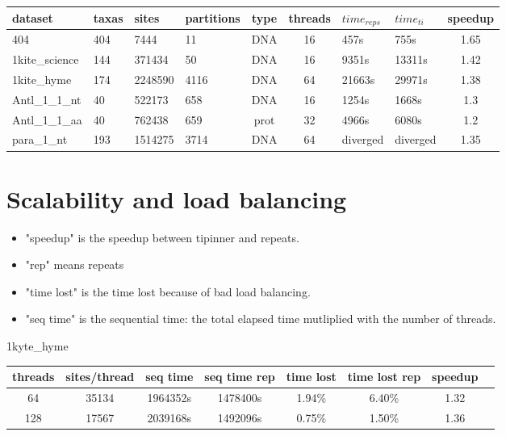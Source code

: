 \documentclass[a4paper]{article}
\begin{document}
\begin{tabular}{|l|l|l|l|c|c|l|l|c|}
\hline dataset                    & taxas & sites    & partitions & type & threads & $time_{reps}$ & $time_{ti}$ & speedup\\
\hline 404                        & 404   &  7444    & 11         & DNA  & 16 & 457s     &  755s     & 1.65  \\
\hline 1kite\_science             & 144   &  371434  & 50         & DNA  & 16 & 9351s    &  13311s   & 1.42  \\
\hline 1kite\_hyme                & 174   &  2248590 & 4116       & DNA  & 64 & 21663s   &  29971s   & 1.38 \\
\hline Antl\_1\_1\_nt             & 40    &  522173  & 658        & DNA  & 16 & 1254s    &  1668s    & 1.3  \\
\hline Antl\_1\_1\_aa             & 40    &  762438  & 659        & prot & 32 & 4966s    &  6080s    & 1.2\\
\hline para\_1\_nt                & 193   &  1514275 & 3714       & DNA  & 64 & diverged &  diverged & 1.35  \\
\hline 
\end{tabular}\newline
\newline


\section{Scalability and load balancing}

\begin{itemize}
\item "speedup" is the speedup between tipinner and repeats.
\item "rep" means repeats
\item "time lost" is the time lost because of bad load balancing. 
\item "seq time" is the sequential time: the total elapsed time mutliplied with the number of threads.
\end{itemize}


1kyte\_hyme

\begin{tabular}{|c|c|c|c|c|c|c|c|}
\hline threads & sites/thread & seq time & seq time rep & time lost & time lost rep & speedup \\
\hline 64 & 35134 & 1964352s & 1478400s & 1.94\% & 6.40\% & 1.32 \\
\hline 128 & 17567 & 2039168s & 1492096s & 0.75\% & 1.50\% & 1.36 \\
\hline
\end{tabular}
\newline
\end{document}
